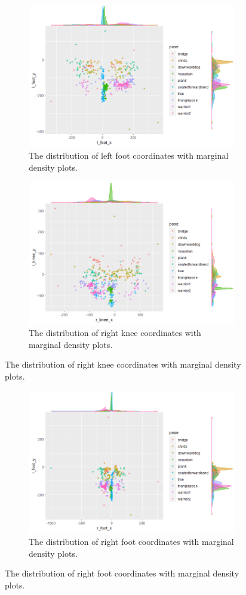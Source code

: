 \documentclass{article}
\begin{document}
\begin{figure}\ContinuedFloat
    \begin{subfigure}[b]{\linewidth}
        \includegraphics[width=0.9\linewidth]{limb-distribution/l_foot.png}
        \caption{The distribution of left foot coordinates with marginal density plots.}
        \label{fig: l_foot}
    \end{subfigure}
    \begin{subfigure}[b]{\linewidth}
        \includegraphics[width=0.9\linewidth]{limb-distribution/r_knee.png}
        \caption{The distribution of right knee coordinates with marginal density plots.}
        \label{fig: r_knee}
    \end{subfigure}
\end{figure}
\begin{figure}\ContinuedFloat
    \begin{subfigure}[b]{\linewidth}
        \includegraphics[width=0.9\linewidth]{limb-distribution/r_foot.png}
        \caption{The distribution of right foot coordinates with marginal density plots.}
        \label{fig: r_foot}
    \end{subfigure}
\end{figure}
\end{document}
